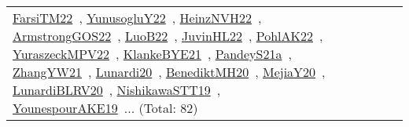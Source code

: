 {\begin{longtable}{lp{3cm}>{\raggedright\arraybackslash}p{6cm}>{\raggedright\arraybackslash}p{6cm}>{\raggedright\arraybackslash}p{8cm}}
\href{works/FarsiTM22.pdf}{FarsiTM22}~\cite{FarsiTM22}, \href{works/YunusogluY22.pdf}{YunusogluY22}~\cite{YunusogluY22}, \href{works/HeinzNVH22.pdf}{HeinzNVH22}~\cite{HeinzNVH22}, \href{works/ArmstrongGOS22.pdf}{ArmstrongGOS22}~\cite{ArmstrongGOS22}, \href{works/LuoB22.pdf}{LuoB22}~\cite{LuoB22}, \href{works/JuvinHL22.pdf}{JuvinHL22}~\cite{JuvinHL22}, \href{works/PohlAK22.pdf}{PohlAK22}~\cite{PohlAK22}, \href{works/YuraszeckMPV22.pdf}{YuraszeckMPV22}~\cite{YuraszeckMPV22}, \href{works/KlankeBYE21.pdf}{KlankeBYE21}~\cite{KlankeBYE21}, \href{works/PandeyS21a.pdf}{PandeyS21a}~\cite{PandeyS21a}, \href{works/ZhangYW21.pdf}{ZhangYW21}~\cite{ZhangYW21}, \href{works/Lunardi20.pdf}{Lunardi20}~\cite{Lunardi20}, \href{works/BenediktMH20.pdf}{BenediktMH20}~\cite{BenediktMH20}, \href{works/MejiaY20.pdf}{MejiaY20}~\cite{MejiaY20}, \href{works/LunardiBLRV20.pdf}{LunardiBLRV20}~\cite{LunardiBLRV20}, \href{works/NishikawaSTT19.pdf}{NishikawaSTT19}~\cite{NishikawaSTT19}, \href{works/YounespourAKE19.pdf}{YounespourAKE19}~\cite{YounespourAKE19}... (Total: 82)\\

\end{longtable}}

